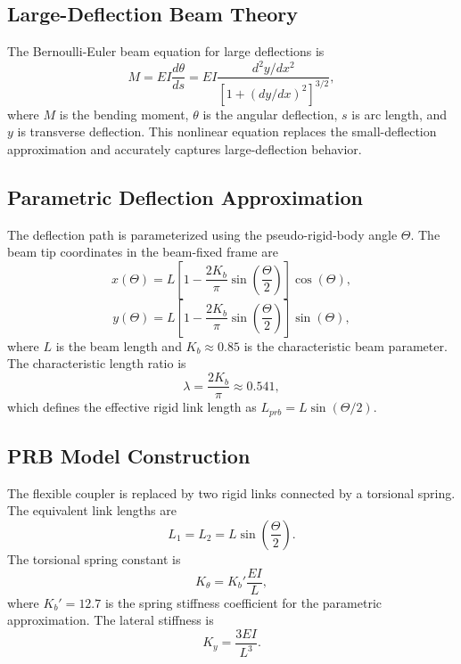 \documentclass[colorlinks,upint,subscriptcorrection,varvw,hyphenate]{asmeconf}
\begin{document}
\subsection{Large-Deflection Beam Theory}
The Bernoulli-Euler beam equation for large deflections is
\begin{equation}
    M = EI \frac{d\theta}{ds} = EI \frac{d^2y/dx^2}{\left[1 + (dy/dx)^2\right]^{3/2}},
\end{equation}
where $M$ is the bending moment, $\theta$ is the angular deflection, $s$ is arc length, and $y$ is transverse deflection. This nonlinear equation replaces the small-deflection approximation and accurately captures large-deflection behavior.

\subsection{Parametric Deflection Approximation}
The deflection path is parameterized using the pseudo-rigid-body angle $\Theta$. The beam tip coordinates in the beam-fixed frame are
\begin{equation}
    x(\Theta) = L\left[1 - \frac{2K_b}{\pi}\sin\left(\frac{\Theta}{2}\right)\right]\cos(\Theta),
\end{equation}
\begin{equation}
    y(\Theta) = L\left[1 - \frac{2K_b}{\pi}\sin\left(\frac{\Theta}{2}\right)\right]\sin(\Theta),
\end{equation}
where $L$ is the beam length and $K_b \approx 0.85$ is the characteristic beam parameter. The characteristic length ratio is
\begin{equation}
    \lambda = \frac{2K_b}{\pi} \approx 0.541,
\end{equation}
which defines the effective rigid link length as $L_{prb} = L\sin(\Theta/2)$.

\subsection{PRB Model Construction}
The flexible coupler is replaced by two rigid links connected by a torsional spring. The equivalent link lengths are
\begin{equation}
    L_1 = L_2 = L\sin\left(\frac{\Theta}{2}\right).
\end{equation}
The torsional spring constant is
\begin{equation}
    K_\theta = K_b' \frac{EI}{L},
\end{equation}
where $K_b' = 12.7$ is the spring stiffness coefficient for the parametric approximation. The lateral stiffness is
\begin{equation}
    K_y = \frac{3EI}{L^3}.
\end{equation}
\end{document}
